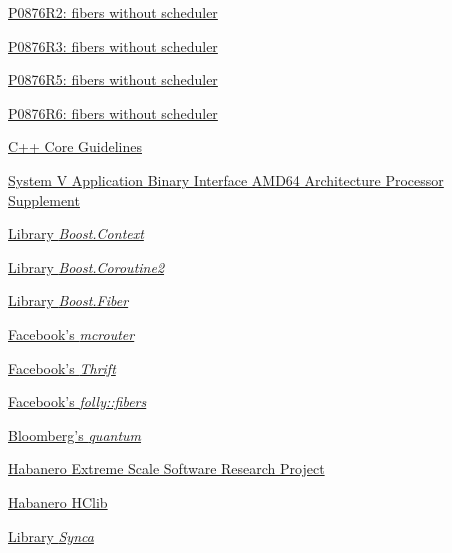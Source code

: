 \begin{thebibliography}{99}
        \href{http://www.open-std.org/jtc1/sc22/wg21/docs/papers/2018/p0876r2.pdf}
        {P0876R2: fibers without scheduler}

        \href{http://www.open-std.org/jtc1/sc22/wg21/docs/papers/2018/p0876r3.pdf}
        {P0876R3: fibers without scheduler}

        \href{http://www.open-std.org/jtc1/sc22/wg21/docs/papers/2019/p0876r5.pdf}
        {P0876R5: fibers without scheduler}

        \href{http://www.open-std.org/jtc1/sc22/wg21/docs/papers/2019/p0876r6.pdf}
        {P0876R6: fibers without scheduler}

        \href{http://isocpp.github.io/CppCoreGuidelines/CppCoreGuidelines#Ri-global}
        {C++ Core Guidelines}

        \href{http://software.intel.com/sites/default/files/article/402129/mpx-linux64-abi.pdf}
        {System V Application Binary Interface AMD64 Architecture Processor
        Supplement}

        \href{http://www.boost.org/doc/libs/release/libs/context/doc/html/index.html}
        {Library \emph{Boost.Context}}

        \href{http://www.boost.org/doc/libs/release/libs/coroutine2/doc/html/index.html}
        {Library \emph{Boost.Coroutine2}}

        \href{http://www.boost.org/doc/libs/release/libs/fiber/doc/html/index.html}
        {Library \emph{Boost.Fiber}}

        \href{https://code.facebook.com/posts/296442737213493/introducing-mcrouter-a-memcached-protocol-router-for-scaling-memcached-deployments}
        {Facebook's \emph{mcrouter}}

        \href{https://github.com/facebook/fbthrift}
        {Facebook's \emph{Thrift}}

        \href{https://github.com/facebook/folly/tree/master/folly/fibers}
        {Facebook's \emph{folly::fibers}}

        \href{https://github.com/bloomberg/quantum}
        {Bloomberg's \emph{quantum}}

    \href{https://wiki.rice.edu/confluence/display/HABANERO/Habanero+Extreme+Scale+Software+Research+Project}
        {Habanero Extreme Scale Software Research Project}

    \href{https://github.com/habanero-rice/hclib}
        {Habanero HClib}

        \href{https://github.com/gridem/Synca}
        {Library \emph{Synca}}

\end{thebibliography}

